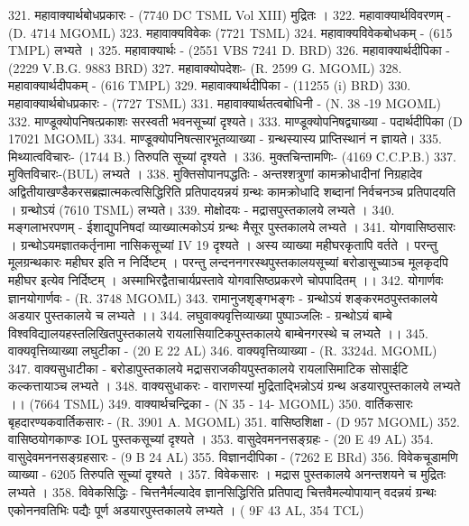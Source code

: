 321. महावाक्यार्थबोधप्रकारः - (7740 DC TSML Vol XIII) मुद्रितः । 
322. महावाक्यार्थविवरणम् - (D. 4714 MGOML)
323. महावाक्यविवेकः (7721 TSML)
324. महावाक्यविवेकबोधकम् - (615 TMPL) लभ्यते ।
325. महावाक्यार्थः - (2551 VBS 7241 D. BRD)
326. महावाक्यार्थदीपिका - (2229 V.B.G. 9883 BRD)
327. महावाक्योपदेशः- (R. 2599 G. MGOML)
328. महावाक्यार्थदीपकम् - (616 TMPL)
329. महावाक्यार्थदीपिका - (11255 (i) BRD)
330. महावाक्यार्थबोधप्रकारः - (7727 TSML)
331. महावाक्यार्थतत्वबोधिनी - (N. 38 -19 MGOML)
332. माण्डूक्योपनिषत्प्रकाशः सरस्वती भवनसूच्यां दृश्यते। 
333. माण्डूक्योपनिषद्व्याख्या - पदार्थदीपिका (D 17021 MGOML)
334. माण्डूक्योपनिषत्सारभूतव्याख्या - ग्रन्थस्यास्य प्राप्तिस्थानं न ज्ञायते। 
335. मिथ्यात्वविचारः- (1744 B.) तिरुपति सूच्यां दृश्यते । 
336. मुक्तचिन्तामणिः- (4169 C.C.P.B.)
337. मुक्तिविचारः-(BUL) लभ्यते । 
338. मुक्तिसोपानपद्धतिः - अन्तश्शत्रुणां कामक्रोधादीनां निग्रहादेव अद्वितीयाखण्डैकरसब्रह्मात्मकत्वसिद्धिरिति प्रतिपादयन्नयं ग्रन्थः कामक्रोधादि शब्दानां निर्वचनञ्च प्रतिपादयति । ग्रन्थोऽयं (7610 TSML) लभ्यते।
339. मोक्षोदयः - मद्रासपुस्तकालये लभ्यते । 
340. मङ्गलाभरपणम् - ईशाद्युपनिषदां व्याख्यात्मकोऽयं ग्रन्थः मैसूर पुस्तकालये लभ्यते । 
341. योगवासिष्ठसारः । ग्रन्थोऽयमज्ञातकर्तृनामा नासिकसूच्यां IV 19 दृश्यते । अस्य व्याख्या महीघरकृतापि वर्तते । परन्तु मूलग्रन्थकारः महीघर इति न निर्दिष्टम् । परन्तु लन्दननगरस्थपुस्तकालयसूच्यां बरोडासूच्याञ्च मूलकृदपि महीघर इत्येव निर्दिष्टम् । अस्माभिरद्वैताचार्यप्रस्तावे योगवासिष्ठप्रकरणे चोपपादितम् ।। 
342. योगार्णवः ज्ञानयोगार्णवः - (R. 3748 MGOML)
343. रामानुजशृङ्गभङ्गः - ग्रन्थोऽयं शङ्करमठपुस्तकालये अडयार पुस्तकालये च लभ्यते ।।
344. लघुवाक्यवृत्तिव्याख्या पुष्पाञ्जलिः - ग्रन्थोऽयं बाम्बे विश्वविद्यालयहस्तलिखितपुस्तकालये रायलासियाटिकपुस्तकालये बाम्बेनगरस्थे च लभ्यतेे ।। 
345. वाक्यवृत्तिव्याख्या लघुटीका - (20 E 22 AL)
346. वाक्यवृत्तिव्याख्या - (R. 3324d. MGOML)
347. वाक्यसुधाटीका - बरोडापुस्तकालये मद्रासराजकीयपुस्तकालये रायलासिमाटिक सोसाईटि कल्कत्तायाञ्च लभ्यते । 
348. वाक्यसुधाकरः - वाराणस्यां मुद्रिताद्भिन्नोऽयं ग्रन्थ अडयारपुस्तकालये लभ्यते ।। (7664 TSML)
349. वाक्यार्थचन्द्रिका - (N 35 - 14- MGOML)
350. वार्तिकसारः बृहदारण्यकवार्तिकसारः - (R. 3901 A. MGOML)
351. वासिष्ठशिक्षा - (D 957 MGOML)
352. वासिष्ठयोगकाण्डः IOL पुस्तकसूच्यां दृश्यते । 
353. वासुदेवमननसङ्ग्रहः - (20 E 49 AL) 
354. वासुदेवमननसङ्ग्रहसारः - (9 B 24 AL)
355. विज्ञानदीपिका - (7262 E BRd)
356. विवेकचूडामणि व्याख्या - 6205 तिरुपति सूच्यां दृश्यते । 
357. विवेकसारः । मद्रास पुस्तकालये अनन्तशयने च मुद्रितः लभ्यते । 
358. विवेकसिद्धिः - चित्तनैर्मल्यादेव ज्ञानसिद्धिरिति प्रतिपाद्य चित्तवैमल्योपायान् वदन्नयं ग्रन्थः एकोननवतिभिः पद्यैः पूर्ण अडयारपुस्तकालये लभ्यते । ( 9F 43 AL, 354 TCL)
